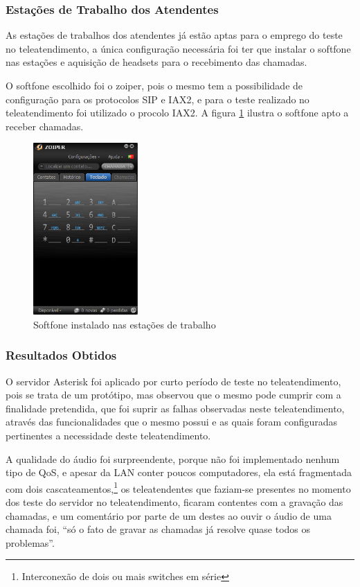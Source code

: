 \subsubsection{Estações de Trabalho dos Atendentes}
As estações de trabalhos dos atendentes já estão aptas para o emprego do teste no teleatendimento, a única configuração necessária foi ter que instalar o softfone nas estações e aquisição de headsets para o recebimento das chamadas.

O softfone escolhido foi o zoiper, pois o mesmo tem a possibilidade de configuração para os protocolos SIP e IAX2, e para o teste realizado no teleatendimento foi utilizado o procolo IAX2. A figura \ref{Figura30} ilustra o softfone apto a receber chamadas.

\begin{figure}[h]
	\centering
	\includegraphics[width=4cm]{imagens/zoiper.png}
	\caption{Softfone instalado nas estações de trabalho}
    \label{Figura30}
\end{figure}

\subsubsection{Resultados Obtidos}
O servidor Asterisk foi aplicado por curto período de teste no teleatendimento, pois se trata de um protótipo, mas observou que o mesmo pode cumprir com a finalidade pretendida, que foi suprir as falhas observadas neste teleatendimento, através das funcionalidades que o mesmo possui e as quais foram configuradas pertinentes a necessidade deste teleatendimento.

A qualidade do áudio foi surpreendente, porque não foi implementado nenhum tipo de QoS, e  apesar da LAN conter poucos computadores, ela está fragmentada com dois cascateamentos,\footnote{Interconexão de dois ou mais switches em série
} os teleatendentes que faziam-se presentes no momento dos teste do servidor no teleatendimento, ficaram contentes com a gravação das chamadas, e um comentário por parte de um destes ao ouvir o áudio de uma chamada foi, “só o fato de gravar as chamadas já resolve quase todos os problemas”. 

